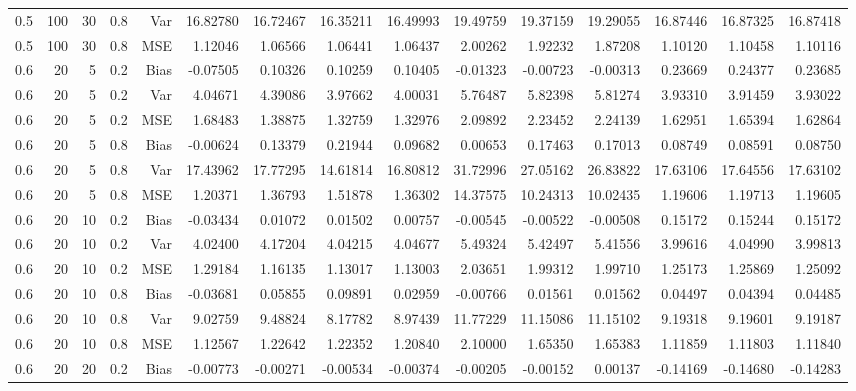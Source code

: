 \begin{table}[!htbp]
\begin{tabular}{lrrrrrrrrrrrrrr}
0.5 & 100 & 30 & 0.8 & Var & 16.82780 & 16.72467 & 16.35211 & 16.49993 & 19.49759 & 19.37159 & 19.29055 & 16.87446 & 16.87325 & 16.87418 \\
0.5 & 100 & 30 & 0.8 & MSE & 1.12046 & 1.06566 & 1.06441 & 1.06437 & 2.00262 & 1.92232 & 1.87208 & 1.10120 & 1.10458 & 1.10116 \\
0.6 &  20 &  5 & 0.2 & Bias & -0.07505 & 0.10326 & 0.10259 & 0.10405 & -0.01323 & -0.00723 & -0.00313 & 0.23669 & 0.24377 & 0.23685 \\
0.6 &  20 &  5 & 0.2 & Var & 4.04671 & 4.39086 & 3.97662 & 4.00031 & 5.76487 & 5.82398 & 5.81274 & 3.93310 & 3.91459 & 3.93022 \\
0.6 &  20 &  5 & 0.2 & MSE & 1.68483 & 1.38875 & 1.32759 & 1.32976 & 2.09892 & 2.23452 & 2.24139 & 1.62951 & 1.65394 & 1.62864 \\
0.6 &  20 &  5 & 0.8 & Bias & -0.00624 & 0.13379 & 0.21944 & 0.09682 & 0.00653 & 0.17463 & 0.17013 & 0.08749 & 0.08591 & 0.08750 \\
0.6 &  20 &  5 & 0.8 & Var & 17.43962 & 17.77295 & 14.61814 & 16.80812 & 31.72996 & 27.05162 & 26.83822 & 17.63106 & 17.64556 & 17.63102 \\
0.6 &  20 &  5 & 0.8 & MSE & 1.20371 & 1.36793 & 1.51878 & 1.36302 & 14.37575 & 10.24313 & 10.02435 & 1.19606 & 1.19713 & 1.19605 \\
0.6 &  20 & 10 & 0.2 & Bias & -0.03434 & 0.01072 & 0.01502 & 0.00757 & -0.00545 & -0.00522 & -0.00508 & 0.15172 & 0.15244 & 0.15172 \\
0.6 &  20 & 10 & 0.2 & Var & 4.02400 & 4.17204 & 4.04215 & 4.04677 & 5.49324 & 5.42497 & 5.41556 & 3.99616 & 4.04990 & 3.99813 \\
0.6 &  20 & 10 & 0.2 & MSE & 1.29184 & 1.16135 & 1.13017 & 1.13003 & 2.03651 & 1.99312 & 1.99710 & 1.25173 & 1.25869 & 1.25092 \\
0.6 &  20 & 10 & 0.8 & Bias & -0.03681 & 0.05855 & 0.09891 & 0.02959 & -0.00766 & 0.01561 & 0.01562 & 0.04497 & 0.04394 & 0.04485 \\
0.6 &  20 & 10 & 0.8 & Var & 9.02759 & 9.48824 & 8.17782 & 8.97439 & 11.77229 & 11.15086 & 11.15102 & 9.19318 & 9.19601 & 9.19187 \\
0.6 &  20 & 10 & 0.8 & MSE & 1.12567 & 1.22642 & 1.22352 & 1.20840 & 2.10000 & 1.65350 & 1.65383 & 1.11859 & 1.11803 & 1.11840 \\
0.6 &  20 & 20 & 0.2 & Bias & -0.00773 & -0.00271 & -0.00534 & -0.00374 & -0.00205 & -0.00152 & 0.00137 & -0.14169 & -0.14680 & -0.14283 \\

\end{tabular}
\end{table}

